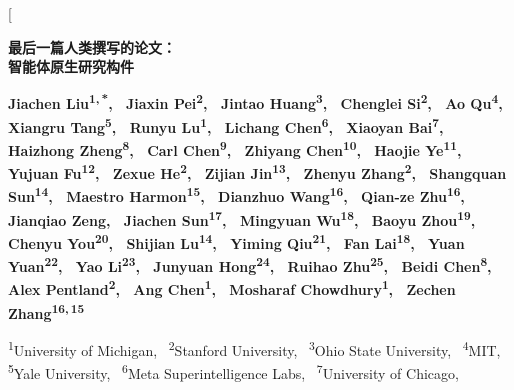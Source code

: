 \documentclass{article}
\theoremstyle{definition}
\begin{document}
\twocolumn[
  \thispagestyle{plain}
  \begin{headerpanel}
    \raggedright
    {\sffamily\bfseries\fontsize{19}{23}\selectfont
      最后一篇人类撰写的论文：\\
      智能体原生研究构件\par
    }
    \vskip 12pt
    {\sffamily\bfseries\normalsize
      Jiachen Liu\textsuperscript{1,\,*},\ %
      Jiaxin Pei\textsuperscript{2},\ %
      Jintao Huang\textsuperscript{3},\ %
      Chenglei Si\textsuperscript{2},\ %
      Ao Qu\textsuperscript{4},\ %
      Xiangru Tang\textsuperscript{5},\ %
      Runyu Lu\textsuperscript{1},\ %
      Lichang Chen\textsuperscript{6},\ %
      Xiaoyan Bai\textsuperscript{7},\ %
      Haizhong Zheng\textsuperscript{8},\ %
      Carl Chen\textsuperscript{9},\ %
      Zhiyang Chen\textsuperscript{10},\ %
      Haojie Ye\textsuperscript{11},\ %
      Yujuan Fu\textsuperscript{12},\ %
      Zexue He\textsuperscript{2},\ %
      Zijian Jin\textsuperscript{13},\ %
      Zhenyu Zhang\textsuperscript{2},\ %
      Shangquan Sun\textsuperscript{14},\ %
      Maestro Harmon\textsuperscript{15},\ %
      Dianzhuo Wang\textsuperscript{16},\ %
      Qian-ze Zhu\textsuperscript{16},\ %
      Jianqiao Zeng,\ %
      Jiachen Sun\textsuperscript{17},\ %
      Mingyuan Wu\textsuperscript{18},\ %
      Baoyu Zhou\textsuperscript{19},\ %
      Chenyu You\textsuperscript{20},\ %
      Shijian Lu\textsuperscript{14},\ %
      Yiming Qiu\textsuperscript{21},\ %
      Fan Lai\textsuperscript{18},\ %
      Yuan Yuan\textsuperscript{22},\ %
      Yao Li\textsuperscript{23},\ %
      Junyuan Hong\textsuperscript{24},\ %
      Ruihao Zhu\textsuperscript{25},\ %
      Beidi Chen\textsuperscript{8},\ %
      Alex Pentland\textsuperscript{2},\ %
      Ang Chen\textsuperscript{1},\ %
      Mosharaf Chowdhury\textsuperscript{1},\ %
      Zechen Zhang\textsuperscript{16,\,15}\par
    }
    \vskip 6pt
    {\small
      \textsuperscript{1}University of Michigan,\ %
      \textsuperscript{2}Stanford University,\ %
      \textsuperscript{3}Ohio State University,\ %
      \textsuperscript{4}MIT,\ %
      \textsuperscript{5}Yale University,\ %
      \textsuperscript{6}Meta Superintelligence Labs,\ %
      \textsuperscript{7}University of Chicago,\ %
}
\end{headerpanel}
\end{document}
